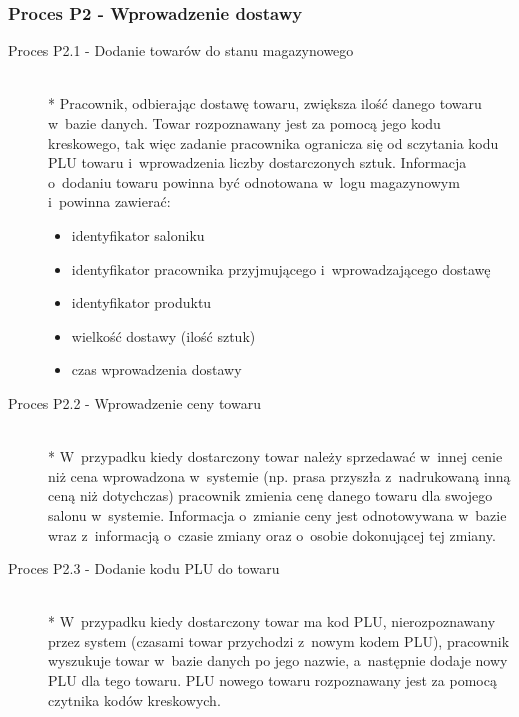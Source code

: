 \subsubsection{Proces P2 - Wprowadzenie dostawy}
\begin{description}
\item[Proces P2.1 - Dodanie towarów do stanu magazynowego] ~\\*
Pracownik, odbierając dostawę towaru, zwiększa ilość danego towaru w~bazie danych. Towar rozpoznawany jest za pomocą jego kodu kreskowego, tak więc zadanie pracownika ogranicza się od sczytania kodu PLU towaru i~wprowadzenia liczby dostarczonych sztuk. Informacja o~dodaniu towaru powinna być odnotowana w~logu magazynowym i~powinna zawierać:
\begin{itemize}
\item identyfikator saloniku
\item identyfikator pracownika przyjmującego i~wprowadzającego dostawę
\item identyfikator produktu
\item wielkość dostawy (ilość sztuk)
\item czas wprowadzenia dostawy
\end{itemize}
\item[Proces P2.2 - Wprowadzenie ceny towaru] ~\\*
W~przypadku kiedy dostarczony towar należy sprzedawać w~innej cenie niż cena wprowadzona w~systemie (np. prasa przyszła z~nadrukowaną inną ceną niż dotychczas) pracownik zmienia cenę danego towaru dla swojego salonu w~systemie. Informacja o~zmianie ceny jest odnotowywana w~bazie wraz z~informacją o~czasie zmiany oraz o~osobie dokonującej tej zmiany.
\item[Proces P2.3 - Dodanie kodu PLU do towaru] ~\\*
W~przypadku kiedy dostarczony towar ma kod PLU, nierozpoznawany przez system (czasami towar przychodzi z~nowym kodem PLU), pracownik wyszukuje towar w~bazie danych po jego nazwie, a~następnie dodaje nowy PLU dla tego towaru. PLU nowego towaru rozpoznawany jest za pomocą czytnika kodów kreskowych.
\end{description}
